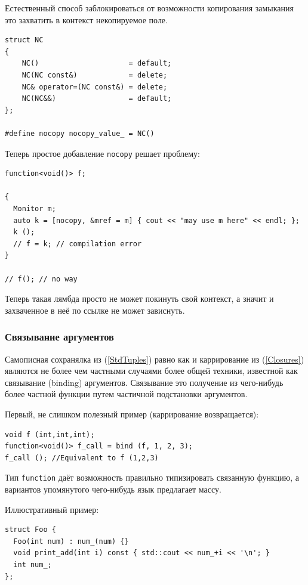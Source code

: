 \documentclass[a4paper,12pt,oneside]{article}
\begin{document}
Естественный способ заблокироваться от возможности копирования замыкания это захватить в контекст некопируемое поле.

\begin{lstlisting}
struct NC
{
    NC()                     = default;
    NC(NC const&)            = delete;
    NC& operator=(NC const&) = delete;
    NC(NC&&)                 = default;
};

#define nocopy nocopy_value_ = NC()
\end{lstlisting}

Теперь простое добавление \lstinline!nocopy! решает проблему:

\begin{lstlisting}
function<void()> f;

{
  Monitor m;
  auto k = [nocopy, &mref = m] { cout << "may use m here" << endl; };
  k ();
  // f = k; // compilation error
}

// f(); // no way
\end{lstlisting}

Теперь такая лямбда просто не может покинуть свой контекст, а значит и захваченное в неё по ссылке не может зависнуть.

\subsubsection{Связывание аргументов}\label{Binding}

Самописная сохранялка из (\ref{StdTuples}) равно как и каррирование из (\ref{Closures}) являются не более чем частными случаями более общей техники, известной как связывание (binding) аргументов. Связывание это получение из чего-нибудь более частной функции путем частичной подстановки аргументов. 

Первый, не слишком полезный пример (каррирование возвращается):

\begin{lstlisting}
void f (int,int,int);
function<void()> f_call = bind (f, 1, 2, 3);
f_call (); //Equivalent to f (1,2,3)
\end{lstlisting}

Тип \lstinline!function! даёт возможность правильно типизировать связанную функцию, а вариантов упомянутого чего-нибудь язык предлагает массу.

Иллюстративный пример:

\begin{lstlisting}
struct Foo {
  Foo(int num) : num_(num) {}
  void print_add(int i) const { std::cout << num_+i << '\n'; }
  int num_;
};
\end{lstlisting}
\end{document}
